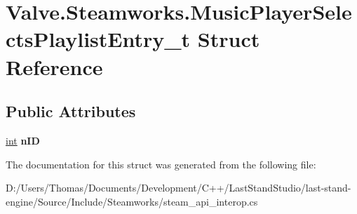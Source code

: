 \hypertarget{structValve_1_1Steamworks_1_1MusicPlayerSelectsPlaylistEntry__t}{}\section{Valve.\+Steamworks.\+Music\+Player\+Selects\+Playlist\+Entry\+\_\+t Struct Reference}
\label{structValve_1_1Steamworks_1_1MusicPlayerSelectsPlaylistEntry__t}
\subsection*{Public Attributes}
\begin{DoxyCompactItemize}
\item 
\hypertarget{structValve_1_1Steamworks_1_1MusicPlayerSelectsPlaylistEntry__t_a4a8be73fd04c96f774ddd0ba123ea0ba}{}\hyperlink{SDL__thread_8h_a6a64f9be4433e4de6e2f2f548cf3c08e}{int} {\bfseries n\+I\+D}\label{structValve_1_1Steamworks_1_1MusicPlayerSelectsPlaylistEntry__t_a4a8be73fd04c96f774ddd0ba123ea0ba}

\end{DoxyCompactItemize}


The documentation for this struct was generated from the following file\+:\begin{DoxyCompactItemize}
\item 
D\+:/\+Users/\+Thomas/\+Documents/\+Development/\+C++/\+Last\+Stand\+Studio/last-\/stand-\/engine/\+Source/\+Include/\+Steamworks/steam\+\_\+api\+\_\+interop.\+cs\end{DoxyCompactItemize}
